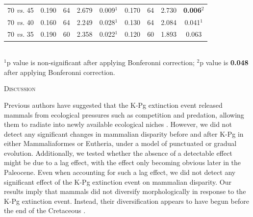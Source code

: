 \documentclass[12pt,letterpaper]{article}
\renewcommand{\section}[1]{%
\bigskip
\begin{center}
\begin{Large}
\normalfont\scshape #1
\medskip
\end{Large}
\end{center}}
\begin{document}
\begin{table}[ht]
\begin{tabular}{c|cccc|cccc}
  70 \textit{vs.} 45 & 0.190 & 64 & 2.679 & 0.009$^1$ & 0.170 & 64 & 2.730 & \textbf{0.006}$^2$ \\ 
  70 \textit{vs.} 40 & 0.160 & 64 & 2.249 & 0.028$^1$ & 0.130 & 64 & 2.084 & 0.041$^1$ \\ 
  70 \textit{vs.} 35 & 0.190 & 60 & 2.358 & 0.022$^1$ & 0.120 & 60 & 1.893 & 0.063 \\ 
   \hline
\end{tabular} \\
   \small{$^1$p value is non-significant after applying Bonferonni correction;
   $^2$p value is \textbf{0.048} after applying Bonferonni correction.}
\end{table}



%
%

\section{Discussion}
Previous authors have suggested that the K-Pg extinction event released mammals from ecological pressures such as competition and predation, allowing them to radiate into newly available ecological niches \citep{archibald2011extinction,OLeary08022013,Lovergrove,Slater2012MEE}.
However, we did not detect any significant changes in mammalian disparity before and after K-Pg in either Mammaliaformes or Eutheria, under a model of punctuated or gradual evolution.
Additionally, we tested whether the absence of a detectable effect might be due to a lag effect, with the effect only becoming obvious later in the Paleocene.
Even when accounting for such a lag effect, we did not detect any significant effect of the K-Pg extinction event on mammalian disparity.
Our results imply that mammals did not diversify morphologically in response to the K-Pg extinction event.
Instead, their diversification appears to have begun before the end of the Cretaceous \citep[Figure \ref{fig:Fig_Raw_results}, Table \ref{tab:Tab_results} and see ][]{meredithimpacts2011,dosReis2014,Close2015,Lee2015R759}.
\end{document}
